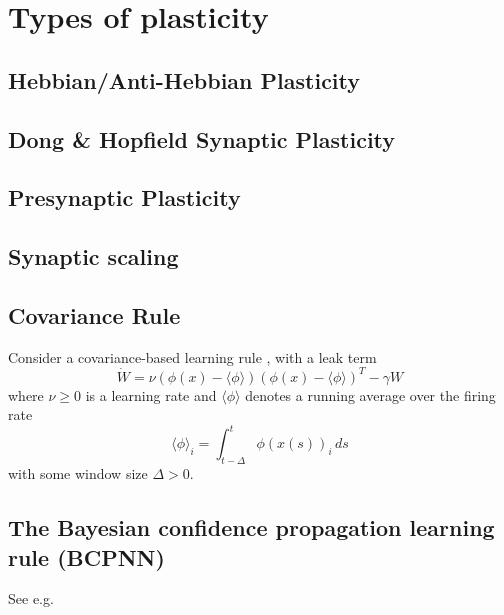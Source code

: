 \documentclass{article}
\theoremstyle{definition} \newtheorem{definition}{Definition}
\theoremstyle{remark} \newtheorem{remark}{Remark}
\newcounter{ct}
\begin{document}
\newpage
%




\newpage
\appendix

\section{Types of plasticity}
\subsection{Hebbian/Anti-Hebbian Plasticity}
\subsection{Dong \& Hopfield Synaptic Plasticity}
\subsection{Presynaptic Plasticity}
\citep{mongillo2008synaptic}
\citep{masse2019circuit}

\subsection{Synaptic scaling}
\citep{renart2003robust}

\subsection{Covariance Rule}
\citep{amit1989modeling}
Consider a covariance-based learning rule \citep{sejnowski1989hebb, gerstner2002mathematical}, with a leak term  
\begin{equation}
    \dot{W} = \nu \left( \phi(x) - \langle \phi \rangle \right) \left( \phi(x) - \langle \phi \rangle \right)^T - \gamma W
\end{equation}
where $\nu \geq 0$ is a learning rate and $\langle \phi \rangle$ denotes a running average over the firing rate  
\begin{equation}
    \langle \phi \rangle_i = \int_{t-\Delta}^{t} \phi(x(s))_i \, ds
\end{equation}
with some window size $\Delta > 0$.

\subsection{The Bayesian confidence propagation learning rule (BCPNN)}
See e.g. \citep{lansner2023fast}
\end{document}
